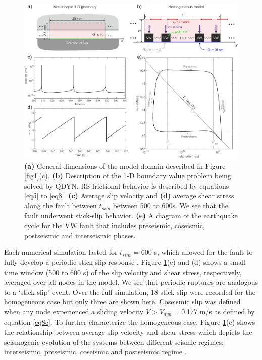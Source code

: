 \documentclass[preprint,1p, 10pt,authoryear]{elsarticle}
\begin{document}
\begin{figure}
	\centering
	\includegraphics{FIG5.pdf} 
	\caption{\textbf{(a)} General dimensions of the model domain described in Figure \ref{fig1}(c). \textbf{(b)} Description of the 1-D boundary value problem being solved by QDYN.  RS frictional behavior is described by equations \eqref{eq5} to \eqref{eq8}. \textbf{(c)} Average slip velocity and \textbf{(d)} average shear stress along the fault between $t_{sim}$ between 500 to 600s. We see that the fault underwent stick-slip behavior. \textbf{(e)} A diagram of the earthquake cycle for the VW fault that includes preseismic, coseismic, postseismic and interseismic phases.}
	\label{fig5}
\end{figure}

Each numerical simulation lasted for $t_{sim}$ = 600 s, which allowed for the fault to fully-develop a periodic stick-slip response \citep{Hillers2007}.  Figure \ref{fig5}(c) and (d) shows a small time window (500 to 600 s) of the slip velocity and shear stress, respectively, averaged over all nodes in the model.  We see that periodic ruptures are analogous to a `stick-slip' event. Over the full simulation, 18 stick-slip were recorded for the homogeneous case but only three are shown here.  Coseismic slip was defined when any node experienced a sliding velocity $V > V_{dyn}=$0.177 m/s as defined by equation \eqref{eq8c}. To further characterize the homogeneous case, Figure \ref{fig5}(e) shows the relationship between average slip velocity and shear stress which depicts the seismogenic evolution of the systems between different seismic regimes: interseismic, preseismic, coseismic and postseismic regime \citep{Ampuero2008}.
\end{document}
